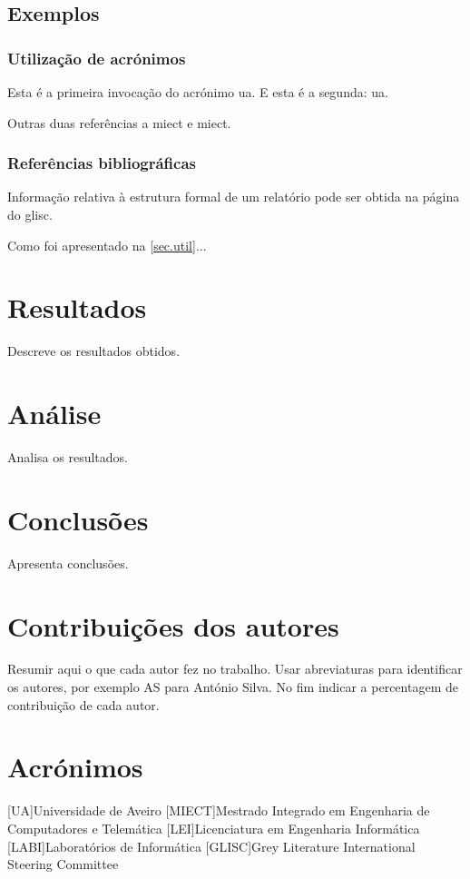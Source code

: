 \documentclass{report}
\begin{document}
\section{Exemplos}

\subsection{Utilização de acrónimos}
\label{sec.util}
Esta é a primeira invocação do acrónimo \ac{ua}.
E esta é a segunda: \ac{ua}.


Outras duas referências a \ac{miect}
e \ac{miect}.

\subsection{Referências bibliográficas}
Informação relativa à estrutura formal de um relatório pode ser obtida
na página do \ac{glisc}\cite{glisc}.

Como foi apresentado na \autoref{sec.util}...

\chapter{Resultados}
\label{chap.resultados}
Descreve os resultados obtidos.

\chapter{Análise}
\label{chap.analise}
Analisa os resultados.

\chapter{Conclusões}
\label{chap.conclusao}
Apresenta conclusões.

\chapter*{Contribuições dos autores}
Resumir aqui o que cada autor fez no trabalho.
Usar abreviaturas para identificar os autores,
por exemplo AS para António Silva.
No fim indicar a percentagem de contribuição de cada autor.

\chapter*{Acrónimos}
\begin{acronym}
[UA]{Universidade de Aveiro}
[MIECT]{Mestrado Integrado em Engenharia de Computadores e Telemática}
[LEI]{Licenciatura em Engenharia Informática}
[LABI]{Laboratórios de Informática}
[GLISC]{Grey Literature International Steering Committee}
\end{acronym}


\printbibliography
\end{document}
